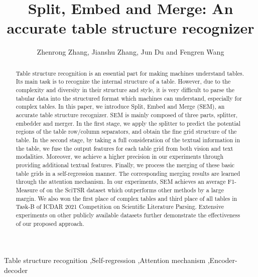 \documentclass[review]{elsarticle}
\begin{document}
\begin{frontmatter}

\title{Split, Embed and Merge: An accurate table structure recognizer}

\author{Zhenrong Zhang, Jianshu Zhang, Jun Du and Fengren Wang}

\begin{abstract}
	Table structure recognition is an essential part for making machines understand tables. Its main task is to recognize the internal structure of a table. However, due to the complexity and diversity in their structure and style, it is very difficult to parse the tabular data into the structured format which machines can understand, especially for complex tables. In this paper, we introduce Split, Embed and Merge (SEM), an accurate table structure recognizer. SEM is mainly composed of three parts, splitter, embedder and merger. In the first stage, we apply the splitter to predict the potential regions of the table row/column separators, and obtain the fine grid structure of the table. In the second stage, by taking a full consideration of the textual information in the table, we fuse the output features for each table grid from both vision and text modalities. Moreover, we achieve a higher precision in our experiments through providing additional textual features. Finally, we process the merging of these basic table grids in a self-regression manner. The corresponding merging results are learned through the attention mechanism. In our experiments, SEM achieves an average F1-Measure of  on the SciTSR dataset which outperforms other methods by a large margin. We also won the first place of complex tables and third place of all tables in Task-B of ICDAR 2021 Competition on Scientific Literature Parsing. Extensive experiments on other publicly available datasets further demonstrate the effectiveness of our proposed approach.
\end{abstract}

\begin{keyword}
	Table structure recognition \sep Self-regression \sep Attention mechanism \sep Encoder-decoder
\end{keyword}

\end{frontmatter}
\end{document}
